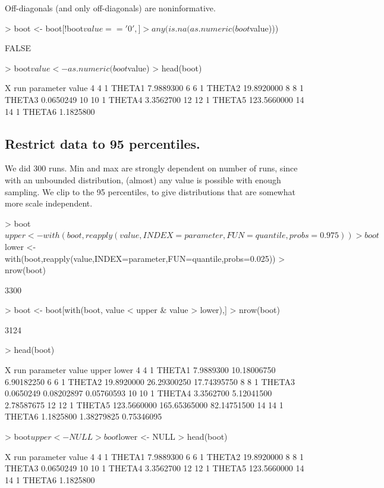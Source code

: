 Off-diagonals (and only off-diagonals) are noninformative.
\begin{Schunk}
\begin{Sinput}
> boot <- boot[!boot$value=='0',]
> any(is.na(as.numeric(boot$value)))
\end{Sinput}
\begin{Soutput}
[1] FALSE
\end{Soutput}
\begin{Sinput}
> boot$value <- as.numeric(boot$value)
> head(boot)
\end{Sinput}
\begin{Soutput}
    X run parameter       value
4   4   1    THETA1   7.9889300
6   6   1    THETA2  19.8920000
8   8   1    THETA3   0.0650249
10 10   1    THETA4   3.3562700
12 12   1    THETA5 123.5660000
14 14   1    THETA6   1.1825800
\end{Soutput}
\end{Schunk}
\subsection{Restrict data to 95 percentiles.}
We did 300 runs.  Min and max are strongly dependent on number of runs, since 
with an unbounded distribution, (almost) any value is possible with enough sampling.
We clip to the 95 percentiles, to give distributions that are somewhat more
scale independent.
\begin{Schunk}
\begin{Sinput}
> boot$upper <- with(boot,reapply(value,INDEX=parameter,FUN=quantile,probs=0.975))
> boot$lower <- with(boot,reapply(value,INDEX=parameter,FUN=quantile,probs=0.025))
> nrow(boot)
\end{Sinput}
\begin{Soutput}
[1] 3300
\end{Soutput}
\begin{Sinput}
> boot <- boot[with(boot, value < upper & value > lower),]
> nrow(boot)
\end{Sinput}
\begin{Soutput}
[1] 3124
\end{Soutput}
\begin{Sinput}
> head(boot)
\end{Sinput}
\begin{Soutput}
    X run parameter       value        upper       lower
4   4   1    THETA1   7.9889300  10.18006750  6.90182250
6   6   1    THETA2  19.8920000  26.29300250 17.74395750
8   8   1    THETA3   0.0650249   0.08202897  0.05760593
10 10   1    THETA4   3.3562700   5.12041500  2.78587675
12 12   1    THETA5 123.5660000 165.65365000 82.14751500
14 14   1    THETA6   1.1825800   1.38279825  0.75346095
\end{Soutput}
\begin{Sinput}
> boot$upper <- NULL
> boot$lower <- NULL
> head(boot)
\end{Sinput}
\begin{Soutput}
    X run parameter       value
4   4   1    THETA1   7.9889300
6   6   1    THETA2  19.8920000
8   8   1    THETA3   0.0650249
10 10   1    THETA4   3.3562700
12 12   1    THETA5 123.5660000
14 14   1    THETA6   1.1825800
\end{Soutput}
\end{Schunk}
